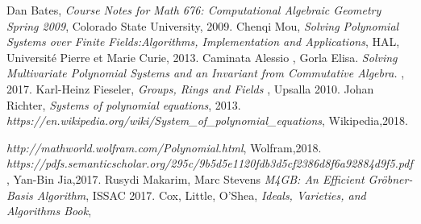 \documentclass[11pt]{article}
\begin{document}
\begin{thebibliography}{1}
  Dan Bates,
  \textit{Course Notes for Math 676: Computational Algebraic Geometry Spring 2009},
   Colorado State University,
   2009.
  Chenqi Mou,
  \textit{Solving Polynomial Systems over Finite Fields:Algorithms, Implementation and Applications},
   HAL,
   Université Pierre et Marie Curie,
   2013.
  Caminata Alessio , Gorla Elisa.
  \textit{Solving Multivariate Polynomial Systems and an Invariant from Commutative Algebra. },
   2017.
  Karl-Heinz Fieseler,
  \textit{Groups, Rings and Fields },
   Upsalla
   2010.
  Johan Richter,
  \textit{Systems of polynomial equations},
   2013.
  \textit{ https://en.wikipedia.org/wiki/System\_of\_polynomial\_equations},
   Wikipedia,2018.

  \textit{ http://mathworld.wolfram.com/Polynomial.html},
   Wolfram,2018.
  \textit{ https://pdfs.semanticscholar.org/295c/9b5d5e1120fdb3d5cf2386d8f6a92884d9f5.pdf},
   Yan-Bin Jia,2017.
  Rusydi Makarim, Marc Stevens
  \textit{ M4GB: An Efficient Gröbner-Basis Algorithm},
   ISSAC 2017.
   Cox, Little, O'Shea,
   \textit{Ideals, Varieties, and Algorithms Book},
\end{thebibliography}
\end{document}

